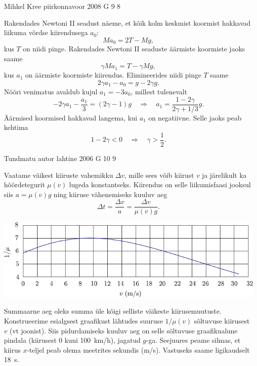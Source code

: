 \documentclass[11pt]{article}
\begin{document}
{%
{Mihkel Kree} %
{piirkonnavoor} %
{2008} %
{G 9} %
{8} %
{

\ifSolution
Rakendades Newtoni II seadust näeme, et kõik kolm keskmist koormist hakkavad liikuma võrdse kiirendusega $a_0$: 
\[
M a_0 = 2T - Mg,
\]
kus $T$ on niidi pinge. Rakendades Newtoni II seaduste äärmiste koormiste jaoks saame
\[
\gamma M a_1 = T - \gamma Mg,
\]
kus $a_1$ on äärmiste koormiste kiirendus. Elimineerides niidi pinge $T$ saame
\[
2\gamma a_1 - a_0 = g - 2\gamma g.
\] 
Nööri venimatus avaldub kujul $a_1 = -3a_0$, millest tulenevalt 
\[
-2 \gamma a_{1}-\frac{a_{1}}{3}=(2 \gamma-1) g \quad \Rightarrow \quad a_{1}=\frac{1-2 \gamma}{2 \gamma+1 / 3} g.
\]
Äärmised koormised hakkavad langema, kui $a_1$ on negatiivne. Selle jaoks peab kehtima
\[
1-2 \gamma<0 \quad\Rightarrow\quad \gamma>\frac{1}{2}.
\]
\fi
}

{Tundmatu autor} %
{lahtine} %
{2006} %
{G 10} %
{9} %
{

\ifSolution
\osa Vaatame väikest kiiruste vahemikku $\Delta v$, mille sees võib kiirust $v$ ja järelikult ka hõõrdetegurit $\mu (v)$ lugeda konstantseks. Kiirendus on selle liikumisfaasi jooksul siis $a = \mu (v)g$ ning kiiruse vähenemiseks kuuluv aeg
\[
\Delta t=\frac{\Delta v}{a}=\frac{\Delta v}{\mu(v) g}.
\]

\begin{center}
	\includegraphics[width=\linewidth]{2006-lahg-10-lah1}
\end{center}

Summaarne aeg oleks summa üle kõigi selliste väikeste kiirusemuutuste. Konstrueerime esialgsest graafikust lähtudes suuruse $1/\mu (v)$ sõltuvuse kiirusest $v$ (vt joonist). Siis pidurdamiseks kuuluv aeg on selle sõltuvuse graafikualune pindala (kiirusest \num{0} kuni \SI{100}{km/h}), jagatud $g$-ga. Seejuures peame silmas, et kiirus $x$-teljel peab olema meetrites sekundis (\si{m/s}). Vastuseks saame ligikaudselt \SI{18}{s}.

}}
\end{document}
